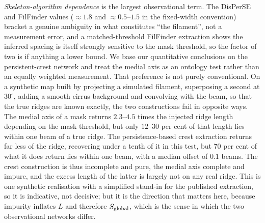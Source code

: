 \documentclass[usenatbib,twoside,twocolumn]{mnras}
\begin{document}
\emph{Skeleton-algorithm dependence} is the largest observational term. The DisPerSE and FilFinder values ($\approx1.8$ and $\approx0.5$--$1.5$ in the fixed-width convention) bracket a genuine ambiguity in what constitutes ``the filament'', not a measurement error, and a matched-threshold FilFinder extraction shows the inferred spacing is itself strongly sensitive to the mask threshold, so the factor of two is if anything a lower bound. We base our quantitative conclusions on the persistent-crest network and treat the medial axis as an ontology test rather than an equally weighted measurement. That preference is not purely conventional. On a synthetic map built by projecting a simulated filament, superposing a second at $30^\circ$, adding a smooth cirrus background and convolving with the beam, so that the true ridges are known exactly, the two constructions fail in opposite ways. The medial axis of a mask returns $2.3$--$4.5$ times the injected ridge length depending on the mask threshold, but only $12$--$30$ per cent of that length lies within one beam of a true ridge. The persistence-based crest extraction returns far less of the ridge, recovering under a tenth of it in this test, but $70$ per cent of what it does return lies within one beam, with a median offset of $0.1$ beams. The crest construction is thus incomplete and pure, the medial axis complete and impure, and the excess length of the latter is largely not on any real ridge. This is one synthetic realisation with a simplified stand-in for the published extraction, so it is indicative, not decisive; but it is the direction that matters here, because impurity inflates $L$ and therefore $S_{\rm global}$, which is the sense in which the two observational networks differ.
\end{document}

